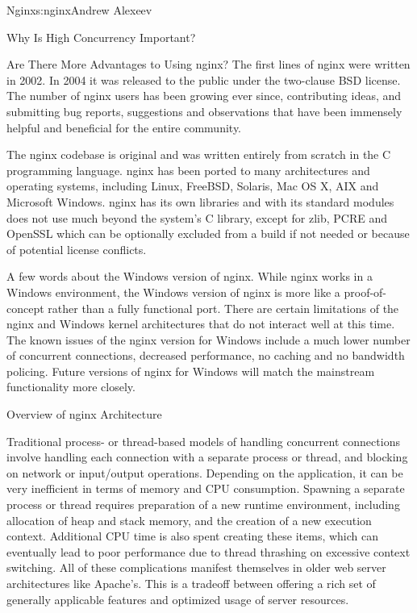 \begin{aosachapter}{Nginx}{s:nginx}{Andrew Alexeev}
\begin{aosasect1}{Why Is High Concurrency Important?}
\begin{aosasect2}{Are There More Advantages to Using nginx?}
The first lines of nginx were written in 2002. In 2004 it was released
to the public under the two-clause BSD license. The number of nginx
users has been growing ever since, contributing ideas, and submitting
bug reports, suggestions and observations that have been immensely
helpful and beneficial for the entire community.

The nginx codebase is original and was written entirely from scratch
in the C programming language. nginx has been ported to many
architectures and operating systems, including Linux, FreeBSD,
Solaris, Mac OS X, AIX and Microsoft Windows. nginx has its own
libraries and with its standard modules does not use much beyond the
system's C library, except for zlib, PCRE and OpenSSL which can be
optionally excluded from a build if not needed or because of potential
license conflicts.

A few words about the Windows version of nginx. While nginx works in a
Windows environment, the Windows version of nginx is more like a
proof-of-concept rather than a fully functional port. There are
certain limitations of the nginx and Windows kernel architectures that
do not interact well at this time. The known issues of the nginx
version for Windows include a much lower number of concurrent
connections, decreased performance, no caching and no bandwidth
policing. Future versions of nginx for Windows will match the
mainstream functionality more closely.

\end{aosasect2}

\end{aosasect1}

\begin{aosasect1}{Overview of nginx Architecture}

Traditional process- or thread-based models of handling concurrent
connections involve handling each connection with a separate process
or thread, and blocking on network or input/output
operations. Depending on the application, it can be very inefficient
in terms of memory and CPU consumption. Spawning a separate process or
thread requires preparation of a new runtime environment, including
allocation of heap and stack memory, and the creation of a new
execution context. Additional CPU time is also spent creating these
items, which can eventually lead to poor performance due to thread
thrashing on excessive context switching. All of these complications
manifest themselves in older web server architectures like
Apache's. This is a tradeoff between offering a rich set of generally
applicable features and optimized usage of server resources.


\end{aosasect1}
\end{aosachapter}
